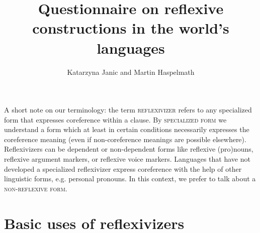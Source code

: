\documentclass[output=paper]{langscibook}
\author{Katarzyna Janic\affiliation{Adam Mickiewicz University} and Martin Haspelmath\affiliation{Max Planck Institute for Evolutionary Anthropology \& Leipzig University}}
\title{Questionnaire on reflexive constructions in the world’s languages}
\begin{document}
\maketitle

\noindent A short note on our terminology: the term \textsc{reflexivizer} refers to any specialized form that expresses coreference within a clause. By \textsc{specialized form} we understand a form which at least in certain conditions necessarily expresses the coreference meaning (even if non-coreference meanings are possible elsewhere). Reflexivizers can be dependent or non-dependent forms like reflexive (pro)nouns, reflexive argument markers, or reflexive voice markers. Languages that have not developed a specialized reflexivizer express coreference with the help of other linguistic forms, e.g. personal pronouns. In this context, we prefer to talk about a \textsc{non-reflexive form}.


\section*{Basic uses of reflexivizers}
\end{document}
